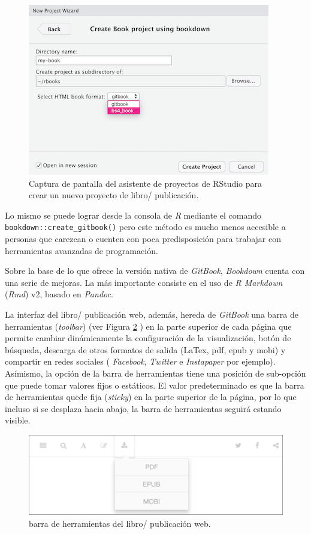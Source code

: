 \documentclass[
]{krantz}
\begin{document}
\begin{figure}

{\centering \includegraphics{images/new-bs4-book} 

}

\caption{Captura de pantalla del asistente de proyectos de RStudio para crear un nuevo proyecto de libro/ publicación.}\label{fig:new-bs4-book}
\end{figure}

Lo mismo se puede lograr desde la consola de \emph{R} mediante el comando \texttt{bookdown::create\_gitbook()} pero este método es mucho menos accesible a personas que carezcan o cuenten con poca predisposición para trabajar con herramientas avanzadas de programación.

Sobre la base de lo que ofrece la versión nativa de \emph{GitBook}, \emph{Bookdown} cuenta con una serie de mejoras. La más importante consiste en el uso de \emph{R Markdown} (\emph{Rmd}) v2, basado en \emph{Pandoc}.

La interfaz del libro/ publicación web, además, hereda de \emph{GitBook} una barra de herramientas (\emph{toolbar}) (ver Figura \ref{fig:gitbook} ) en la parte superior de cada página que permite cambiar dinámicamente la configuración de la visualización, botón de búsqueda, descarga de otros formatos de salida (LaTex, pdf, epub y mobi) y compartir en redes sociales ( \emph{Facebook}, \emph{Twitter} e \emph{Instapaper} por ejemplo). Asímismo, la opción de la barra de herramientas tiene una posición de sub-opción que puede tomar valores fijos o estáticos. El valor predeterminado es que la barra de herramientas quede fija (\emph{sticky}) en la parte superior de la página, por lo que incluso si se desplaza hacia abajo, la barra de herramientas seguirá estando visible.

\begin{figure}
\includegraphics[width=1\linewidth]{images/gitbook} \caption{barra de herramientas del libro/ publicación web. }\label{fig:gitbook}
\end{figure}
\end{document}
